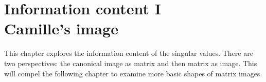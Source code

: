 \chapter{Information content I\\Camille's image}

This chapter explores the information content of the singular values. There are two perspectives: the canonical image as matrix and then matrix as image. This will compel the following chapter to examine more basic shapes of matrix images.

%






\endinput
%
%
%
%
%
%
%
%
%
%
%
%
%
%

\endinput